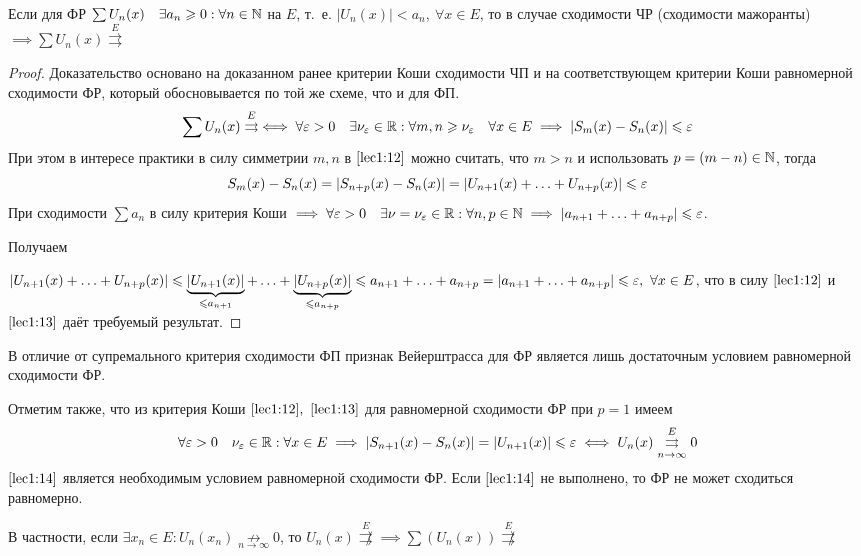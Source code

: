 \documentclass[../../main.tex]{subfiles}
\begin{document}
\begin{thm} 
Если для ФР $\sum U_n(x) \quad \exists a_n \geqslant 0 : \forall n \in \mathbb{N}$ на $E$,
т.~е. $|U_n(x)| < a_n,\ \forall x \in E$, то в случае сходимости 
ЧР (сходимости мажоранты) $\implies \sum U_n(x) \overset{E}{\rightrightarrows}$
\end{thm}	 

\begin{proof}
Доказательство основано на доказанном ранее критерии Коши сходимости ЧП и на
соответствующем критерии Коши равномерной сходимости ФР, который обосновывается
по той же схеме, что и для ФП.
\begin{equation}
\label{lec1:12}
\sum U_n(x) \overset{E}{\rightrightarrows} \iff \forall \varepsilon > 0 \quad
\exists \nu_\varepsilon \in \mathbb{R} : \forall m,n \geqslant \nu_\varepsilon \quad
\forall x \in E \implies
|S_m(x) - S_n(x)| \leqslant \varepsilon
\end{equation}
При этом в интересе практики в силу симметрии $m,n$ в $\eqref{lec1:12}$ можно
считать, что $m > n$ и использовать $p = (m - n) \in \mathbb{N}$, тогда 
\begin{equation}
\label{lec1:13}
S_m(x) - S_n(x) = |S_{n+p}(x) - S_n(x)| =
|U_{n+1}(x) + \ldots + U_{n+p}(x)| \leqslant \varepsilon
\end{equation}
При сходимости $\sum a_n$ в силу критерия Коши $\implies
\forall \varepsilon > 0 \quad \exists \nu = \nu_\varepsilon \in \mathbb{R} : 
\forall n, p \in \mathbb{N} \implies
|a_{n+1} + \ldots + a_{n+p}| \leqslant \varepsilon$.

Получаем

$|U_{n+1}(x) + \ldots + U_{n+p}(x)| \leqslant 
\underbrace{|U_{n+1}(x)|}_{\leqslant a_{n+1}} + \ldots + 
\underbrace{|U_{n+p}(x)|}_{\leqslant a_{n+p}} \leqslant
a_{n+1} + \ldots + a_{n+p} = |a_{n+1} + \ldots + a_{n+p}|
\leqslant \varepsilon,\ \forall x\in E$, что в силу $\eqref{lec1:12}$ и 
$\eqref{lec1:13}$ даёт требуемый результат.
\end{proof}	

\begin{rem}
В отличие от супремального критерия сходимости ФП
признак Вейерштрасса для ФР является лишь достаточным условием 
равномерной сходимости ФР. 
\end{rem}	

Отметим также, что из критерия Коши $\eqref{lec1:12},\ \eqref{lec1:13}$ 
для равномерной сходимости ФР при $p=1$ имеем
\begin{equation}
\label{lec1:14}
\forall \varepsilon > 0 \quad
\nu_\varepsilon \in \mathbb{R} : \forall x \in E \implies
|S_{n+1}(x) - S_n(x)| = |U_{n+1}(x)| \leqslant \varepsilon \iff
U_n(x) \overset{E}
{\underset{n \to \infty}\rightrightarrows} 0
\end{equation} 
$\eqref{lec1:14}$ является необходимым условием равномерной сходимости ФР.
Если $\eqref{lec1:14}$ не выполнено, то ФР не может сходиться равномерно.

В частности, если 
$\exists x_n \in E : U_n(x_n) \underset{n \to \infty}{\not \rightarrow} 0$, то
$U_n(x) \overset{E}{\not \rightrightarrows} \implies
\sum (U_n(x)) \overset{E}{\not \rightrightarrows}$
\end{document}

